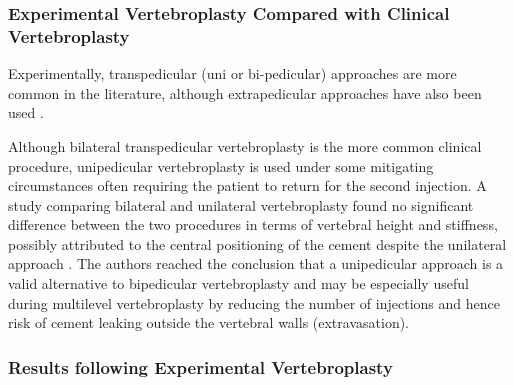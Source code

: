 \subsubsection{Experimental Vertebroplasty Compared with Clinical
Vertebroplasty
}\label{experimental-vertebroplasty-compared-with-clinical-vertebroplasty}

Experimentally, transpedicular (uni or bi-pedicular) approaches are more
common in the literature\cite{furtado2007biomechanical, ananthakrishnan2005effect, pneumaticos2013effect},
although
extrapedicular approaches have also been used \cite{furtado2007biomechanical}.

Although bilateral transpedicular vertebroplasty is the more common clinical
procedure\cite{tohmeh1999biomechanical}, unipedicular vertebroplasty is used
under some
mitigating circumstances often requiring the patient to return for the
second injection. A study comparing bilateral and unilateral
vertebroplasty found no significant difference between the two
procedures in terms of vertebral height and stiffness, possibly
attributed to the central positioning of the cement despite the
unilateral approach \cite{tohmeh1999biomechanical}. The authors reached the
conclusion that a
unipedicular approach is a valid alternative to bipedicular
vertebroplasty and may be especially useful during multilevel
vertebroplasty by reducing the number of injections and hence risk of
cement leaking outside the vertebral walls (extravasation).

\subsubsection{Results following Experimental Vertebroplasty
}\label{results-following-vertebroplasty}

